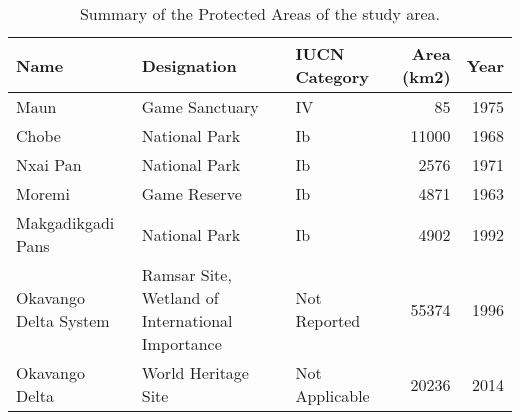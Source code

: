 \begin{table}[H]
\centering
\caption[Summary of the 
                                              Protected Areas, Ngamiland]{Summary of the Protected 
                                       Areas of the study area.} 
\label{table:summary_wdpa_BWA}
\begin{tabular}{lllrr}
  \toprule
Name & Designation & IUCN Category & Area (km2) & Year \\ 
  \midrule
Maun & Game Sanctuary & IV & 85 & 1975 \\ 
  Chobe & National Park & Ib & 11000 & 1968 \\ 
  Nxai Pan & National Park & Ib & 2576 & 1971 \\ 
  Moremi & Game Reserve & Ib & 4871 & 1963 \\ 
  Makgadikgadi Pans & National Park & Ib & 4902 & 1992 \\ 
  Okavango Delta System & Ramsar Site, Wetland of International Importance & Not Reported & 55374 & 1996 \\ 
  Okavango Delta & World Heritage Site & Not Applicable & 20236 & 2014 \\ 
   \bottomrule
\end{tabular}
\end{table}
